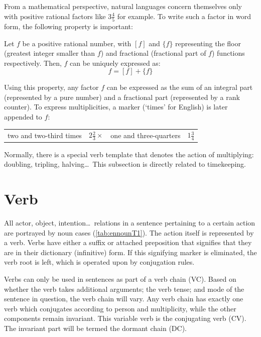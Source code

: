 From a mathematical perspective, natural languages  concern themselves only with positive rational factors like $3\frac{4}{5}$ for example. To write such a factor  in word form,  the following property is important:
\begin{syntax}
Let $f$ be a positive rational number, with $[f]$ and $\{f\}$ representing the floor (greatest integer smaller than $f$) and fractional (fractional part of $f$) functions respectively. Then, $f$ can be uniquely expressed as:\begin{equation}
    f = [f] + \{f\}
    \label{eq:factor}
\end{equation}
\end{syntax}
Using this property, any factor $f$ can be expressed as the sum of an integral part (represented by a pure number) and a fractional part (represented by a rank counter). To express  multiplicities, a marker (`times' for English) is later  appended to $f$:
\begin{example}
    \begin{tabular}{cc|cc}
two and two-third times & $2\frac{2}{3}\times$ & one and three-quarters & $1\frac{3}{4}$ 
    \end{tabular}
\end{example}
Normally, there is  a special verb template that denotes the action of multiplying: doubling, tripling, halving\ldots\, This subsection is directly related to timekeeping.


\section{Verb} \label{sec:enverb}
All actor, object, intention\ldots\, relations in a sentence pertaining to a certain action are portrayed by noun cases (\autoref{tab:ennounT1}). The action itself is  represented by a verb. Verbs have either a suffix or attached preposition that signifies that they are in their dictionary (infinitive) form. If this signifying marker is eliminated, the verb root is left, which is operated upon by conjugation rules. 

Verbs can only be used in sentences as part of a verb chain (VC). Based on whether the verb takes additional arguments;  the verb tense; and mode of the sentence in question,  the verb chain will vary. Any verb chain has exactly one verb which conjugates according to person and multiplicity, while the other components remain invariant. This variable verb is  the conjugating verb (CV). The invariant part will be termed the dormant chain (DC). 

